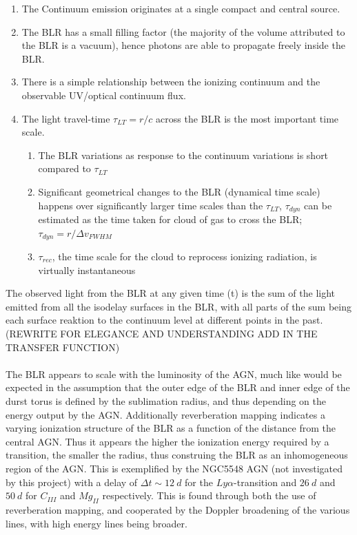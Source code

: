 \documentclass[a4paper, 12pt, twoside]{article}
\begin{document}
\begin{enumerate}
\item The Continuum emission originates at a single compact and central source.
\item The BLR has a small filling factor (the majority of the volume attributed to the BLR is a vacuum), hence photons are able to propagate freely inside the BLR.
\item There is a simple relationship between the ionizing continuum and the observable UV/optical continuum flux.
\item The light travel-time $\tau_{LT}=r/c$ across the BLR is the most important time scale. 
\begin{enumerate}
\item The BLR variations as response to the continuum variations is short compared to $\tau_{LT}$
\item Significant geometrical changes to the BLR (dynamical time scale) happens over significantly larger time scales than the $\tau_{LT}$, $\tau_{dyn}$ can be estimated as the time taken for cloud of gas to cross the BLR; $\tau_{dyn} = r/\Delta v_{FWHM}$
\item $\tau_{rec}$, the time scale for the cloud to reprocess ionizing radiation, is virtually instantaneous
\end{enumerate}
\end{enumerate}
The observed light from the BLR at any given time (t) is the sum of the light emitted from all the isodelay surfaces in the BLR, with all parts of the sum being each surface reaktion to the continuum level at different points in the past. (REWRITE FOR ELEGANCE AND UNDERSTANDING ADD IN THE TRANSFER FUNCTION) \\
\\
The BLR appears to scale with the luminosity of the AGN, much like would be expected in the assumption that the outer edge of the BLR and inner edge of the durst torus is defined by the sublimation radius, and thus depending on the energy output by the AGN. Additionally reverberation mapping indicates a varying ionization structure of the BLR as a function of the distance from the central AGN. Thus it appears the higher the ionization energy required by a transition, the smaller the radius, thus construing the BLR as an inhomogeneous region of the AGN. This is exemplified by the NGC5548 AGN (not investigated by this project) with a delay of $\Delta t\sim 12\ d$ for the $Ly \alpha$-transition and $26\ d$ and $50\ d$ for $C_{III}$ and $Mg_{II}$ respectively. This is found through both the use of reverberation mapping, and cooperated by the Doppler broadening of the various lines, with high energy lines being broader. 
\end{document}
